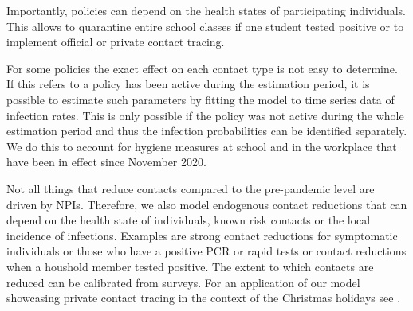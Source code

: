 Importantly, policies can depend on the health states of participating individuals.
This allows to quarantine entire school classes if one student tested positive or
to implement official or private contact tracing.

For some policies the exact effect on each contact type is not easy to determine. If
this refers to a policy has been active during the estimation period, it is possible to
estimate such parameters by fitting the model to time series data of infection rates.
This is only possible if the policy was not active during the whole estimation period
and thus the infection probabilities can be identified separately. We do this to account
for hygiene measures at school and in the workplace that have been in effect since
November 2020.

Not all things that reduce contacts compared to the pre-pandemic level are driven
by NPIs. Therefore, we also model endogenous contact reductions that can depend on
the health state of individuals, known risk contacts or the local incidence of
infections. Examples are strong contact reductions for symptomatic individuals or those
who have a positive PCR or rapid tests or contact reductions when a houshold member
tested positive. The extent to which contacts are reduced can be calibrated from
surveys. For an application of our model showcasing private contact tracing in the
context of the Christmas holidays see \cite{Gabler2020}.






